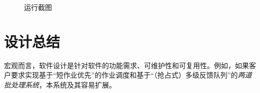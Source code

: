 \documentclass[12pt, a4paper, UTF8]{ctexart}
\begin{document}
\begin{figure}[h]
    \centering
    \caption{运行截图}
\end{figure}

\section{设计总结}

宏观而言，软件设计是针对软件的功能需求、可维护性和可复用性。例如，如果客户要求实现基于“短作业优先”的作业调度和基于“（抢占式）多级反馈队列”的\emph{两道批处理系统}，本系统及其容易扩展。~\\
\end{document}
